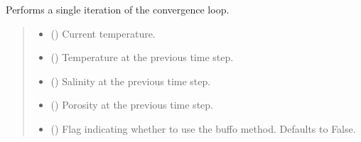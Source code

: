 \documentclass[a4paper,11pt,english,openany]{sphinxmanual}
\begin{document}
\begin{fulllineitems}
\begin{fulllineitems}
\begin{quote}
\begin{description}
\end{description}\end{quote}

\end{fulllineitems}


\begin{fulllineitems}
\label{\detokenize{api/spyice.models.sea_ice_model:spyice.models.sea_ice_model.SeaIceModel.convergence_loop_iteration}}
\pysigstartsignatures
{}
\pysigstopsignatures
\sphinxAtStartPar
Performs a single iteration of the convergence loop.
\begin{quote}\begin{description}
\begin{itemize}
\item {} 
\sphinxAtStartPar
{} () \textendash{} Current temperature.

\item {} 
\sphinxAtStartPar
{} () \textendash{} Temperature at the previous time step.

\item {} 
\sphinxAtStartPar
{} () \textendash{} Salinity at the previous time step.

\item {} 
\sphinxAtStartPar
{} () \textendash{} Porosity at the previous time step.

\item {} 
\sphinxAtStartPar
{} (\sphinxstyleliteralemphasis{\sphinxupquote{, }}) \textendash{} Flag indicating whether to use the buffo method. Defaults to False.


\end{itemize}
\end{description}
\end{quote}
\end{fulllineitems}
\end{fulllineitems}
\end{document}
